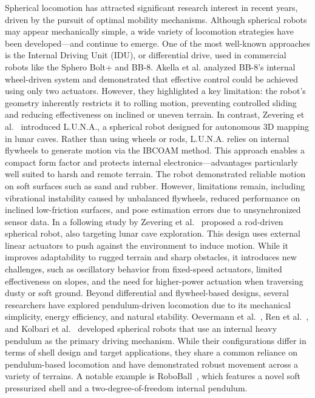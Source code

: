 \documentclass[conference]{IEEEtran}
\begin{document}
Spherical locomotion has attracted significant research interest in recent years, driven by the pursuit of optimal mobility mechanisms. 
Although spherical robots may appear mechanically simple, a wide variety of locomotion strategies have been developed—and continue to emerge. 
One of the most well-known approaches is the Internal Driving Unit (IDU), or differential drive, used in commercial robots like the Sphero Bolt+ and BB-8. 
Akella et al.\cite{Sphero} analyzed BB-8’s internal wheel-driven system and demonstrated that effective control could be achieved using only two actuators. 
However, they highlighted a key limitation: the robot’s geometry inherently restricts it to rolling motion, preventing controlled sliding and reducing effectiveness on inclined or uneven terrain.
In contrast, Zevering et al.~\cite{luna} introduced L.U.N.A., a spherical robot designed for autonomous 3D mapping in lunar caves. 
Rather than using wheels or rods, L.U.N.A. relies on internal flywheels to generate motion via the IBCOAM method. 
This approach enables a compact form factor and protects internal electronics—advantages particularly well suited to harsh and remote terrain. 
The robot demonstrated reliable motion on soft surfaces such as sand and rubber. 
However, limitations remain, including vibrational instability caused by unbalanced flywheels, reduced performance on inclined low-friction surfaces, and pose estimation errors due to unsynchronized sensor data.
In a following study by Zevering et al.~\cite{rod_sphere} proposed a rod-driven spherical robot, also targeting lunar cave exploration. 
This design uses external linear actuators to push against the environment to induce motion. 
While it improves adaptability to rugged terrain and sharp obstacles, it introduces new challenges, such as oscillatory behavior from fixed-speed actuators, limited effectiveness on slopes, and the need for higher-power actuation when traversing dusty or soft ground.
Beyond differential and flywheel-based designs, several researchers have explored pendulum-driven locomotion due to its mechanical simplicity, energy efficiency, and natural stability. 
Oevermann et al.~\cite{roboball}, Ren et al.~\cite{novelsphere}, and  Kolbari et al.~\cite{pendulum_sphere} developed spherical robots that use an internal heavy pendulum as the primary driving mechanism. 
While their configurations differ in terms of shell design and target applications, they share a common reliance on pendulum-based locomotion and have demonstrated robust movement across a variety of terrains.
A notable example is RoboBall~\cite{roboball}, which features a novel soft pressurized shell and a two-degree-of-freedom internal pendulum. 
\end{document}
